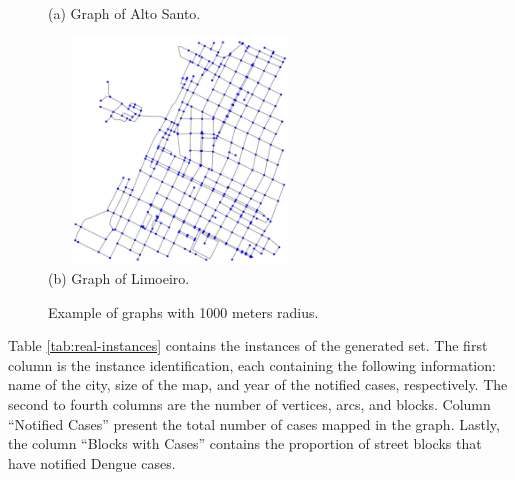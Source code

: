 \documentclass[a4paper,11pt]{article}
\begin{document}
\begin{figure}[!ht]
\begin{minipage}[c]{.6\textwidth}
    (a) Graph of Alto Santo.
  \end{minipage}
  \begin{minipage}[c]{.6\textwidth}
    \includegraphics[width=7cm, height=6cm]{graph-limoeiro.png} \\
    (b) Graph of Limoeiro.
  \end{minipage}
  \caption{\label{fig:graph-examples} Example of graphs with 1000 meters radius.}
\end{figure}

Table \ref{tab:real-instances} contains the instances  of the generated set. The
first  column is  the  instance identification,  each  containing the  following
information: name of the city, size of  the map, and year of the notified cases,
respectively. The second to fourth columns are the number of vertices, arcs, and
blocks. Column  ``Notified Cases'' present the  total number of cases  mapped in
the graph. Lastly,  the column ``Blocks with Cases'' contains  the proportion of
street blocks that have notified Dengue cases.
\end{document}

